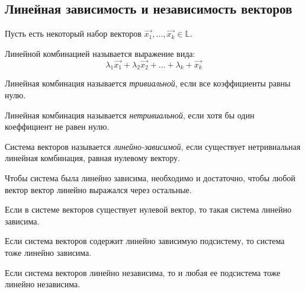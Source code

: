 \subsection{Линейная зависимость и независимость векторов}

Пусть есть некоторый набор векторов $\vec{x_1}, \ldots, \vec{x_k} \in \mathbb{L}$.

\begin{definition}
    Линейной комбинацией называется выражение вида: \[
        \lambda_1 \vec{x_1} + \lambda_2 \vec{x_2} + \ldots + \lambda_k + \vec{x_k}
    \]
\end{definition}

\begin{definition}
    Линейная комбинация называется \textit{тривиальной}, если все коэффициенты равны нулю.
\end{definition}

\begin{definition}
    Линейная комбинация называется \textit{нетривиальной}, если хотя бы один коеффициент не равен нулю.
\end{definition}

\begin{definition}
    Система векторов называется \textit{линейно-зависимой}, если существует нетривиальная линейная комбинация, равная нулевому вектору. 
\end{definition}

\begin{theorem}
    Чтобы система была линейно зависима, необходимо и достаточно, чтобы любой вектор вектор линейно выражался через остальные.
\end{theorem}

\begin{property}
    Если в системе векторов существует нулевой вектор, то такая система линейно зависима.
\end{property}

\begin{property}
    Если система векторов содержит линейно зависимую подсистему, то система тоже линейно зависима.
\end{property}

\begin{property}
    Если система векторов линейно независима, то и любая ее подсистема тоже линейно независима.
\end{property}

